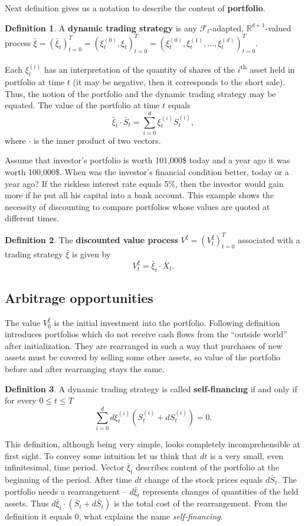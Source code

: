\documentclass[a4paper,11pt, twoside]{book}
\theoremstyle{definition}
\newtheorem{mydef}{Definition}[chapter]
\theoremstyle{remark}
\newcounter{example}[chapter]
\def\R{{\mathbb{R}}}
\def\Sa{\bar{S}}
\def\Xa{\bar{X}}
\def\xia{\bar{\xi}}
\begin{document}
Next definition gives us a notation to describe the content of \textbf{portfolio}.
\begin{mydef}
A \textbf{dynamic trading strategy} is any $\mathcal{F}_t$-adapted,  $\R^{d+1}$-valued process $\xia = (\xia_t)_{t=0}^T = (\xi^{(0)}_t, \xi_t)_{t=0}^T = (\xi^{(0)}_t, \xi^{(1)}_t, \ldots, \xi^{(d)}_t)_{t=0}^T$.
\end{mydef}
Each $\xi^{(i)}_t$ has an interpretation of the quantity of shares of the $i$\textsuperscript{th} asset held in portfolio at time $t$ (it may be negative, then it corresponds to the short sale). Thus, the notion of the portfolio and the dynamic trading strategy may be equated. The value of the portfolio at time $t$ equals
\[\xia_t \cdot \Sa_t = \sum\limits_{i=0}^d \xi^{(i)}_t S^{(i)}_t,\]
where $\cdot$ is the inner product of two vectors.

Assume that investor's portfolio is worth 101,000\$ today and a year ago it was worth 100,000\$. When was the investor's financial condition better, today or a year ago? If the riskless interest rate equals 5\%, then the investor would gain more if he put all his capital into a bank account. This example shows the necessity of discounting to compare portfolios whose values are quoted at different times.
\begin{mydef}
 The \textbf{discounted value process} $V^{\xi} = (V^{\xi}_t)_{t=0}^T$ associated with a trading strategy $\xia$ is given by 
 \begin{equation*}
  V^{\xi}_t = \xia_t \cdot \Xa_t.
 \end{equation*}
\end{mydef}

\subsection{Arbitrage opportunities}
The value $V^{\xi}_0$ is the initial investment into the portfolio. Following definition introduces portfolios which do not receive cash flows from the ``outside world'' after initialization. They are rearranged in such a way that purchases of new assets must be covered by selling some other assets, so value of the portfolio before and after rearranging stays the same.
\begin{mydef}
 A dynamic trading strategy is called \textbf{self-financing} if and only if for every $0 \leq t \leq T$
 \[ \sum\limits_{i=0}^d d\xi^{(i)}_t (S^{(i)}_t + dS^{(i)}_t) = 0. \]
\end{mydef}
This definition, although being very simple, looks completely incomprehensible at first sight. To convey some intuition let us think that $dt$ is a very small, even infinitesimal, time period. Vector $\xia_t$ describes content of the portfolio at the beginning of the period. After time $dt$ change of the stock prices equals $d\Sa_t$. The portfolio needs a rearrangement -- $d\xia_t$ represents changes of quantities of the held assets.
Thus $d\xia_t \cdot (\Sa_t + d\Sa_t)$ is the total cost of the rearrangement. From the definition it equals 0, what explains the name \textit{self-financing}.
\end{document}

